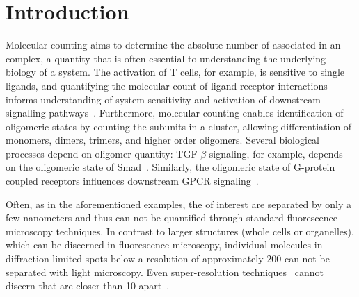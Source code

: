\section{Introduction}



%
Molecular counting aims to determine the absolute number of \smallobjects
associated in an complex, a quantity that is often essential to understanding
the underlying biology of a system.
  The activation of T cells, for example, is sensitive to single ligands, and
  quantifying the molecular count of ligand-receptor interactions informs
  understanding of system sensitivity and activation of downstream signalling 
  pathways~\citep{irvine_2002}.
  Furthermore, molecular counting enables identification of oligomeric states by
  counting the subunits in a cluster, allowing differentiation of monomers, dimers,
  trimers, and higher order oligomers.
  Several biological processes depend on oligomer quantity: TGF-$\beta$ signaling,
  for example, depends on the oligomeric state of Smad~\citep{inman_2002,
  moustakas_2002}.
  Similarly, the oligomeric state of G-protein coupled receptors influences
  downstream GPCR signaling~\citep{felce_2018, breitwieser_2004}.

%
Often, as in the aforementioned examples, the \smallobjects of interest are separated by only a few
nanometers and thus can not be quantified through standard fluorescence
microscopy techniques.
  In contrast to larger structures (whole cells or organelles), which can
  be discerned in fluorescence microscopy, individual molecules in
  diffraction limited spots below a resolution of approximately 200 \nanometer can not
  be separated with light microscopy.
  Even super-resolution techniques~\citep{betzig_2006,rust_2006,rittweger_sted_2009} cannot discern 
  \smallobjects that are closer than 10 \nanometer apart~\citep{valli_seeing_2021}.


